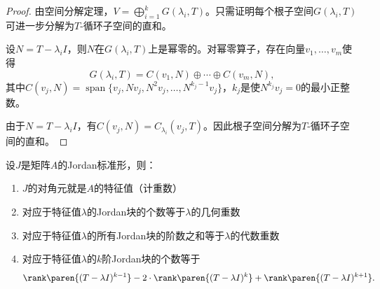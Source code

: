 \begin{proof}
    由空间分解定理，$V = \bigoplus_{i=1}^k G(\lambda_i, T)$。只需证明每个根子空间$G(\lambda_i, T)$可进一步分解为$T$-循环子空间的直和。

    设$N = T - \lambda_i I$，则$N$在$G(\lambda_i, T)$上是幂零的。对幂零算子，存在向量$v_1, \ldots, v_m$使得
    \begin{equation}
        G(\lambda_i, T) = C(v_1, N) \oplus \cdots \oplus C(v_m, N),
    \end{equation}
    其中$C(v_j, N) = \operatorname{span}\{v_j, Nv_j, N^2v_j, \ldots, N^{k_j-1}v_j\}$，$k_j$是使$N^{k_j}v_j = 0$的最小正整数。

    由于$N = T - \lambda_i I$，有$C(v_j, N) = C_{\lambda_i}(v_j, T)$。因此根子空间分解为$T$-循环子空间的直和。
\end{proof}

\begin{proposition}
    设$J$是矩阵$A$的Jordan标准形，则：
    \begin{enumerate}
        \item $J$的对角元就是$A$的特征值（计重数）
        \item 对应于特征值$\lambda$的Jordan块的个数等于$\lambda$的几何重数
        \item 对应于特征值$\lambda$的所有Jordan块的阶数之和等于$\lambda$的代数重数
        \item 对应于特征值$\lambda$的$k$阶Jordan块的个数等于
        \begin{equation}
            \rank\paren{(T-\lambda I)^{k-1}} - 2\cdot\rank\paren{(T-\lambda I)^k} + \rank\paren{(T-\lambda I)^{k+1}}.
        \end{equation}
    \end{enumerate}
\end{proposition}

